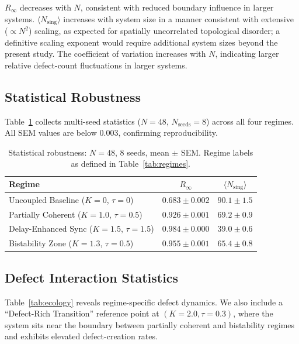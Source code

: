\documentclass[11pt,a4paper]{article}
\begin{document}
$R_\infty$ decreases with $N$, consistent with reduced boundary
influence in larger systems. $\langle N_{\text{sing}}\rangle$
increases with system size in a manner consistent with extensive
($\propto N^2$) scaling, as expected for spatially uncorrelated
topological disorder; a definitive scaling exponent would require
additional system sizes beyond the present study. The
coefficient of variation increases with $N$, indicating larger
relative defect-count fluctuations in larger systems.

\subsection{Statistical Robustness}

Table~\ref{tab:robustness} collects multi-seed statistics
($N=48$, $N_{\text{seeds}}=8$) across all four regimes.
All SEM values are below $0.003$, confirming reproducibility.

\begin{table}[htbp]
\centering
\caption{%
  Statistical robustness: $N=48$, 8 seeds, mean $\pm$ SEM.
  Regime labels as defined in Table~\ref{tab:regimes}.%
}
\label{tab:robustness}
\begin{tabular}{@{}lcc@{}}
\toprule
\textbf{Regime} & $R_\infty$ & $\langle N_{\text{sing}}\rangle$ \\
\midrule
Uncoupled Baseline ($K=0$, $\tau=0$)
  & $0.683 \pm 0.002$ & $90.1 \pm 1.5$ \\
Partially Coherent ($K=1.0$, $\tau=0.5$)
  & $0.926 \pm 0.001$ & $69.2 \pm 0.9$ \\
Delay-Enhanced Sync ($K=1.5$, $\tau=1.5$)
  & $0.984 \pm 0.000$ & $39.0 \pm 0.6$ \\
Bistability Zone ($K=1.3$, $\tau=0.5$)
  & $0.955 \pm 0.001$ & $65.4 \pm 0.8$ \\
\bottomrule
\end{tabular}
\end{table}

\subsection{Defect Interaction Statistics}

Table~\ref{tab:ecology} reveals regime-specific defect
dynamics. We also include a ``Defect-Rich Transition'' reference point
at $(K=2.0, \tau=0.3)$, where the system sits near the
boundary between partially coherent and bistability regimes
and exhibits elevated defect-creation rates.
\end{document}
